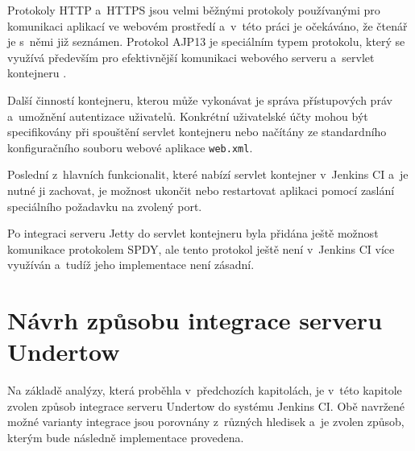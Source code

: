             Protokoly HTTP a~HTTPS jsou velmi běžnými protokoly používanými pro 
            komunikaci aplikací ve webovém prostředí a~v~této práci je očekáváno, 
            že čtenář je s~němi již seznámen. Protokol AJP13 je speciálním
            typem protokolu, který se využívá především pro efektivnější komunikaci
            webového serveru a~servlet kontejneru \cite{ajp13Web}.
            
            Další činností kontejneru, kterou může vykonávat 
            je správa přístupových práv a~umožnění autentizace uživatelů. 
            Konkrétní uživatelské účty mohou být specifikovány
            při spouštění servlet kontejneru nebo načítány ze
            standardního konfiguračního
            souboru webové aplikace \texttt{web.xml}.


            Poslední z~hlavních funkcionalit, které nabízí servlet kontejner v~Jenkins CI
            a~je nutné ji zachovat,
            je možnost ukončit nebo restartovat aplikaci pomocí zaslání
            speciálního požadavku na zvolený port. 

            Po integraci serveru Jetty do servlet kontejneru byla přidána ještě možnost
            komunikace protokolem SPDY, ale tento protokol ještě není 
            v~Jenkins CI více využíván a~tudíž jeho implementace není zásadní.

        


    \section{Návrh způsobu integrace serveru Undertow} \label{secNavrh}
        Na základě analýzy, která proběhla v~předchozích kapitolách,
        je v~této kapitole zvolen způsob
        integrace serveru Undertow do systému Jenkins CI. 
        Obě navržené možné varianty integrace jsou porovnány z~různých
        hledisek a~je zvolen způsob, kterým bude následně implementace provedena.

